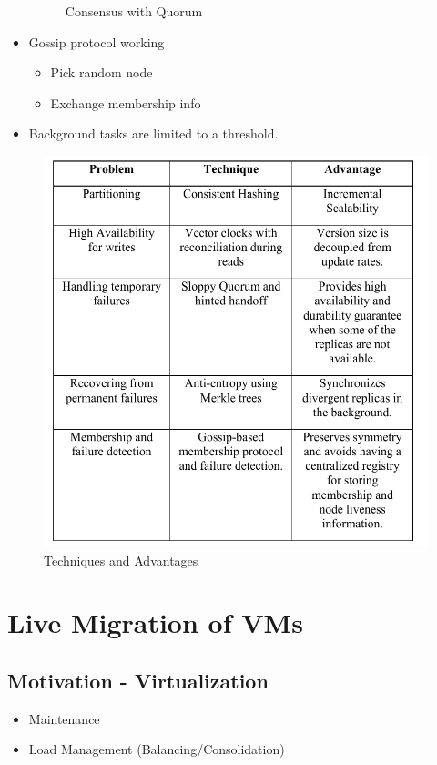 \documentclass[parskip=half]{scrartcl}
\begin{document}
\begin{itemize}
\begin{figure}[th]
            \caption{Consensus with Quorum}
            \label{fig:dynamo-consensus}
        \end{figure}
        \item
        Gossip protocol working
        \begin{itemize}
            \item
            Pick random node
            \item
            Exchange membership info
        \end{itemize}
        \item
        Background tasks are limited to a threshold.
    \end{itemize}


    \begin{figure}[th]
    \centering
    \includegraphics[width=.5\textwidth]{dynamo-techniques}
    \caption{Techniques and Advantages}
    \label{fig:dynamo-techniques}
    \end{figure}


\newpage

\section{Live Migration of VMs} %
\label{sec:live_migration_of_vms}

    \subsection{Motivation - Virtualization} %
    \label{sub:motivation_virtualization}

        \begin{itemize}
            \item Maintenance
            \item Load Management (Balancing/Consolidation)
        \end{itemize}
\end{document}
